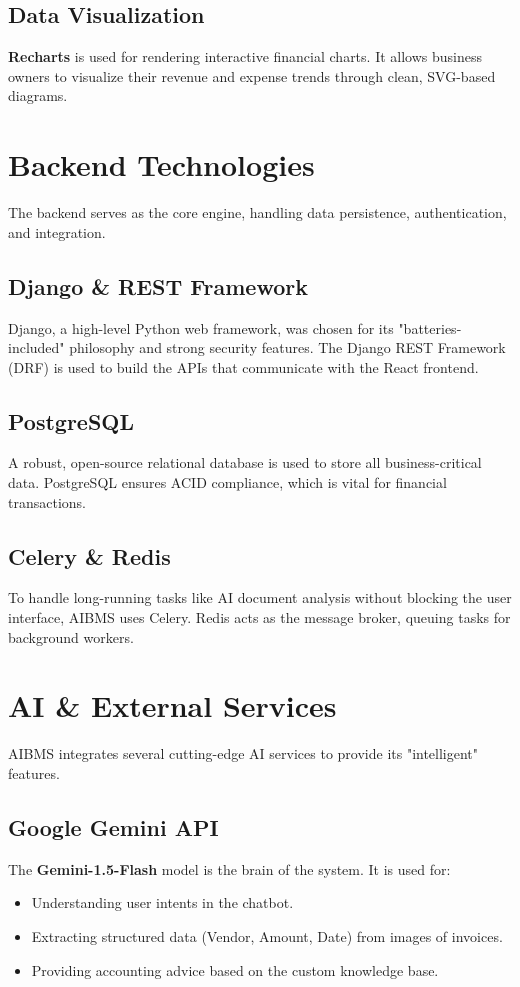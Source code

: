 \documentclass[12pt,a4paper]{report}
\begin{document}
\subsection{Data Visualization}
\textbf{Recharts} is used for rendering interactive financial charts. It allows business owners to visualize their revenue and expense trends through clean, SVG-based diagrams.

\section{Backend Technologies}
The backend serves as the core engine, handling data persistence, authentication, and integration.

\subsection{Django \& REST Framework}
Django, a high-level Python web framework, was chosen for its "batteries-included" philosophy and strong security features. The Django REST Framework (DRF) is used to build the APIs that communicate with the React frontend.

\subsection{PostgreSQL}
A robust, open-source relational database is used to store all business-critical data. PostgreSQL ensures ACID compliance, which is vital for financial transactions.

\subsection{Celery \& Redis}
To handle long-running tasks like AI document analysis without blocking the user interface, AIBMS uses Celery. Redis acts as the message broker, queuing tasks for background workers.

\section{AI \& External Services}
AIBMS integrates several cutting-edge AI services to provide its "intelligent" features.

\subsection{Google Gemini API}
The \textbf{Gemini-1.5-Flash} model is the brain of the system. It is used for:
\begin{itemize}
    \item Understanding user intents in the chatbot.
    \item Extracting structured data (Vendor, Amount, Date) from images of invoices.
    \item Providing accounting advice based on the custom knowledge base.
\end{itemize}
\end{document}
